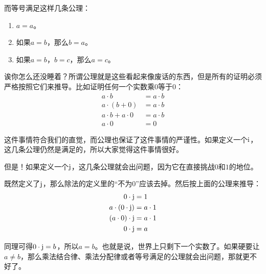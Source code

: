 而等号满足这样几条公理：
\begin{enumerate}
\item $a=a$。
\item 如果$a=b$，那么$b=a$。
\item 如果$a=b$，$b=c$，那么$a=c$。
\end{enumerate}

诶你怎么还没睡着？所谓公理就是这些看起来像废话的东西，但是所有的证明必须严格按照它们来推导。比如证明任何一个实数乘$0$等于$0$：
\begin{align*}
a \cdot b&=a \cdot b \\
a \cdot (b+0)&=a \cdot b \\
a \cdot b+a \cdot 0&=a \cdot b \\
a \cdot 0&=0
\end{align*}

这件事情符合我们的直觉，而公理也保证了这件事情的严谨性。如果定义一个$\mathrm{i}$，这几条公理仍然是满足的，所以大家觉得这件事情很好。

但是！如果定义一个$\mathrm{j}$，这几条公理就会出问题，因为它在直接挑战$0$和$1$的地位。

既然定义了$\mathrm{j}$，那么除法的定义里的“不为$0$”应该去掉。然后按上面的公理来推导：
\begin{align*}
0 \cdot \mathrm{j}&=1 \\
a \cdot (0 \cdot \mathrm{j})&=a \cdot 1 \\
(a \cdot 0) \cdot \mathrm{j}&=a \cdot 1 \\
0 \cdot \mathrm{j}&=a
\end{align*}

同理可得$0 \cdot \mathrm{j}=b$，所以$a=b$。也就是说，世界上只剩下一个实数了。如果硬要让$a \neq b$，那么乘法结合律、乘法分配律或者等号满足的公理就会出问题，那就更不好了。

